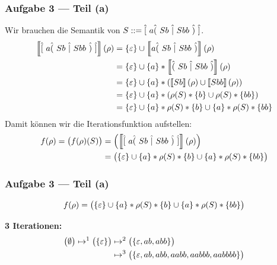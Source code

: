 \documentclass{beamer}
\newcommand{\sem}[1]{\left\llbracket #1 \right\rrbracket}
\begin{document}
\begin{frame} \frametitle{Aufgabe 3 --- Teil (a)}
	Wir brauchen die Semantik von $S ::= \hat{[} \ a\hat{(} \ Sb \ \hat{|} \ Sbb \ \hat{)} \ \hat{]}$.
	\pause
		\begin{align*}
		\sem{\byp{a \opt{Sb}{Sbb}}}(\rho)
		&= \menge{\epsilon} \cup \sem{a \opt{Sb}{Sbb}}(\rho) \\
		&= \menge{\epsilon} \cup \menge{a} * \sem{\opt{Sb}{Sbb}}(\rho) \\
		&= \menge{\epsilon} \cup \menge{a} * \brackets{\sem{Sb}(\rho) \cup \sem{Sbb}(\rho)} \\
		&= \menge{\epsilon} \cup \menge{a} * \brackets{\rho(S) * \menge{b} \cup \rho(S) * \menge{bb}} \\
		&= \menge{\epsilon} \cup \menge{a} * \rho(S) * \menge{b} \cup \menge{a} * \rho(S) * \menge{bb}
	\end{align*}
	\pause
	Damit können wir die Iterationsfunktion aufstellen:
	\begin{align*}
		f(\rho) = \begin{pmatrix} f(\rho)(S) \end{pmatrix} 
		&= \begin{pmatrix} \sem{\byp{a \opt{Sb}{Sbb}}}(\rho) \end{pmatrix} \\
		&= \begin{pmatrix}
			\menge{\epsilon} \cup \menge{a} * \rho(S) * \menge{b} \cup \menge{a} * \rho(S) * \menge{bb}
		\end{pmatrix}
	\end{align*}
\end{frame}

\begin{frame} \frametitle{Aufgabe 3 --- Teil (a)}
	\begin{equation*}
		f(\rho) = \begin{pmatrix}
			\left\{ \varepsilon \right\} \cup \left\{ a \right\} * \rho(S) * \left\{ b \right\} \cup \left\{ a \right\} * \rho(S) * \left\{ bb \right\}
		\end{pmatrix}
	\end{equation*}
	\pause
	
	\textbf{3 Iterationen:}
	\begin{align*}
		\begin{pmatrix} \emptyset \end{pmatrix}
		\mapsto^1
		\begin{pmatrix} \left\{ \varepsilon \right\} \end{pmatrix}
		&\mapsto^2
		\begin{pmatrix} \left\{ \varepsilon, ab, abb \right\} \end{pmatrix} \\
		&\mapsto^3
		\begin{pmatrix} \left\{ \varepsilon, ab, abb, aabb, aabbb, aabbbb \right\} \end{pmatrix}
	\end{align*}
\end{frame}
\end{document}
